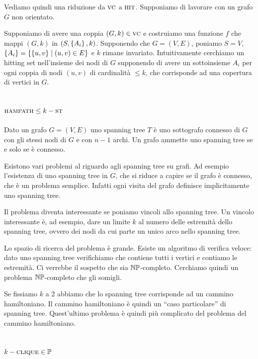 Vediamo quindi una riduzione da $\textsc{vc}$ a $\textsc{hit}$. Supponiamo di lavorare con un grafo $G$ non
orientato.

Supponiamo di avere una coppia $(G,k) \in \textsc{vc}$ e costruiamo una funzione $f$ che mappi $(G,k)$ in
$(S,\left\{A_{i}\right\},k)$. Supponendo che $G = (V,E)$, poniamo $S = V$, $\left\{A_{i}\right\} = \left\{\left\{u,v\right\}
\mid (u,v) \in E\right\}$ e $k$ rimane invariato. Intuitivamente cerchiamo un hitting set nell'insieme dei
nodi di $G$ supponendo di avere un sottoinsieme $A_{i}$ per ogni coppia di nodi $(u,v)$ di
cardinalità $\leq k$, che corrisponde ad una copertura di vertici in $G$.


\subsection{$\textsc{hampath} \leq k-\textsc{st}$}

Dato un grafo $G = (V,E)$ uno spanning tree $T$ è uno sottografo connesso di $G$ con gli stessi
nodi di $G$ e con $n-1$ archi. Un grafo ammette uno spanning tree se e solo se è connesso.

Esistono vari problemi al riguardo agli spanning tree su grafi. Ad esempio l'esistenza di uno
spanning tree in $G$, che si riduce a capire se il grafo è connesso, che è un problema semplice.
Infatti ogni visita del grafo definisce implicitamente uno spanning tree. 

Il problema diventa interessante se poniamo vincoli allo spanning tree. Un vincolo interessante è,
ad esempio, dare un limite $k$ al numero delle estremità dello spanning tree, ovvero dei nodi da
cui parte un unico arco nello spanning tree.

Lo spazio di ricerca del problema è grande. Esiste un algoritmo di verifica veloce: dato uno
spanning tree verifichiamo che contiene tutti i vertici e contiamo le estremità. Ci verrebbe il
sospetto che sia $\mathbb{NP}$-completo. Cerchiamo quindi un problema $\mathbb{NP}$-completo che gli
somigli. 

Se fissiamo $k$ a 2 abbiamo che lo spanning tree corrisponde ad un cammino hamiltoniano. Il cammino
hamiltoniano è quindi un ``caso particolare'' di spanning tree. Quest'ultimo problema è quindi
più complicato del problema del cammino hamiltoniano.


\subsection{$k-\textsc{clique} \in \mathbb{P}$}

